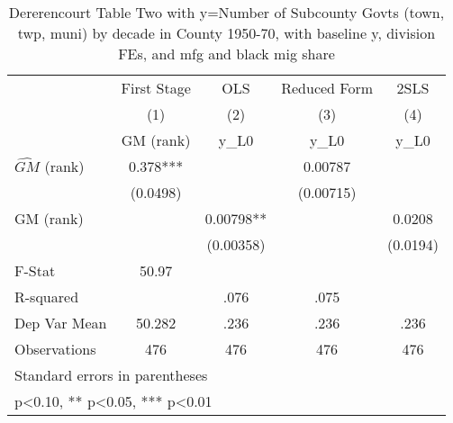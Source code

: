 \begin{table}[htbp]\centering
\def\sym#1{\ifmmode^{#1}\else\(^{#1}\)\fi}
\caption{Dererencourt Table Two with y=Number of Subcounty Govts (town, twp, muni) by decade in County 1950-70, with baseline y, division FEs, and mfg and black mig share}
\begin{tabular}{l*{4}{c}}
\toprule
                    & First Stage   &         OLS   &Reduced Form   &        2SLS   \\
                    &\multicolumn{1}{c}{(1)}&\multicolumn{1}{c}{(2)}&\multicolumn{1}{c}{(3)}&\multicolumn{1}{c}{(4)}\\
                    &\multicolumn{1}{c}{GM  (rank)}&\multicolumn{1}{c}{y\_L0}&\multicolumn{1}{c}{y\_L0}&\multicolumn{1}{c}{y\_L0}\\
\midrule
$\hat{GM}$ (rank)   &       0.378***&               &     0.00787   &               \\
                    &    (0.0498)   &               &   (0.00715)   &               \\
\addlinespace
GM  (rank)          &               &     0.00798** &               &      0.0208   \\
                    &               &   (0.00358)   &               &    (0.0194)   \\
\midrule
F-Stat              &       50.97   &               &               &               \\
R-squared           &               &        .076   &        .075   &               \\
Dep Var Mean        &      50.282   &        .236   &        .236   &        .236   \\
Observations        &         476   &         476   &         476   &         476   \\
\bottomrule
\multicolumn{5}{l}{\footnotesize Standard errors in parentheses}\\
\multicolumn{5}{l}{\footnotesize * p<0.10, ** p<0.05, *** p<0.01}\\
\end{tabular}
\end{table}
